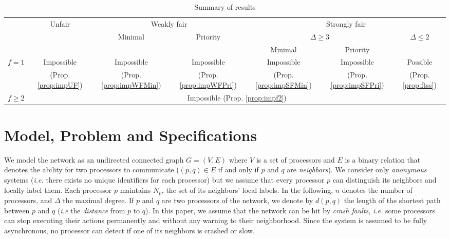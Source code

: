 \documentclass[11pt,english,letterpaper]{article}
\begin{document}
\begin{table}[!h]
\centering
	\begin{tabular}{|c||c|c|c|c|c|c|}
	\cline{2-7}
	\multicolumn{1}{c||}{}  & Unfair & \multicolumn{2}{c|}{Weakly fair} & \multicolumn{3}{c|}{Strongly fair}\tabularnewline
	\cline{3-7}
	 \multicolumn{1}{c||}{} &  & Minimal & Priority & \multicolumn{2}{c|}{$\Delta\geq3$} & $\Delta\leq2$ \tabularnewline
	\cline{5-6} 
	\multicolumn{1}{c||}{}  &  & & & Minimal & Priority & \tabularnewline
	\hline
	\hline
	 $f=1$ & Impossible & Impossible & Impossible & Impossible & Impossible & Possible \tabularnewline
	       & (Prop. \ref{prop:impUF}) & (Prop. \ref{prop:impWFMin}) & (Prop. \ref{prop:impWFPri}) & (Prop. \ref{prop:impSFMin}) & (Prop. \ref{prop:impSFPri}) & (Prop. \ref{prop:ftss})\tabularnewline
	\cline{1-7}
	  $f\geq2$ & \multicolumn{6}{c|}{Impossible (Prop. \ref{prop:impf2})}\tabularnewline
	\hline
	\end{tabular}
\caption{Summary of results}
\label{table1}
\end{table}

\section{Model, Problem and Specifications}\label{sec:Model}

We model the network as an undirected connected graph $G=(V,E)$ where $V$ is a set of processors and $E$ is a binary relation that denotes the ability for two processors to communicate ($(p,q)\in E$ if and only if $p$ and $q$ are \emph{neighbors}). We consider only \emph{anonymous} systems (\emph{i.e.} there exists no unique identifiers for each processor) but we assume that every processor $p$ can distinguish its neighbors and locally label them. Each processor $p$ maintains $N_{p}$, the set of its neighbors' local labels. In the following, $n$ denotes the number of processors, and $\Delta$ the maximal degree. If $p$ and $q$ are two processors of the network, we denote by $d(p,q)$ the length of the shortest path between $p$ and $q$ (\emph{i.e} the \emph{distance} from $p$ to $q$). In this paper, we assume that the network can be hit by \emph{crash faults}, \emph{i.e.} some processors can stop executing their actions permanently and without any warning to their neighborhood. Since the system is assumed to be fully asynchronous, no processor can detect if one of its neighbors is crashed or slow.	
\end{document}
